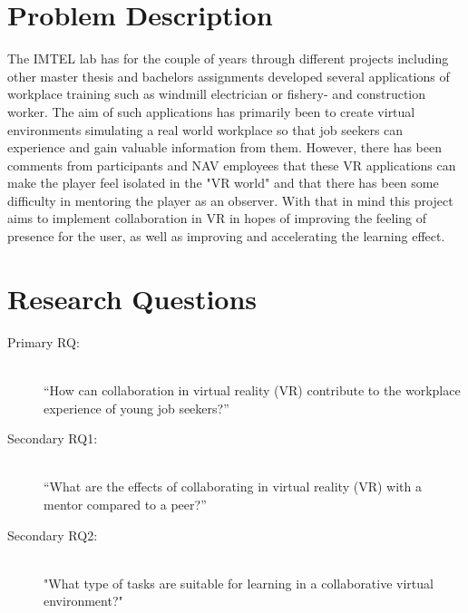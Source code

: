









%

\section{Problem Description}
The IMTEL lab has for the couple of years through different projects including other master thesis and bachelors assignments developed several applications of workplace training such as windmill electrician \cite{henrichsen2019engaging} or fishery- and construction worker. The aim of such applications has primarily been to create virtual environments simulating a real world workplace so that job seekers can experience and gain valuable information from them.
However, there has been comments from participants and NAV employees that these VR applications can make the player feel isolated in the "VR world" and that there has been some difficulty in mentoring the player as an observer. With that in mind this project aims to implement collaboration in VR in hopes of improving the feeling of presence for the user, as well as improving and accelerating the learning effect. 


\section{Research Questions}
\label{RQ}
\begin{description}
    \item [Primary RQ:]\hfill \\
    “How can collaboration in virtual reality (VR) contribute to the workplace experience of young job seekers?” 
    \item [Secondary RQ1:]\hfill \\
    “What are the effects of collaborating in virtual reality (VR) with a mentor compared to a peer?”
    \item [Secondary RQ2:]\hfill \\
    "What type of tasks are suitable for learning in a collaborative virtual environment?"
\end{description}


\cleardoublepage
